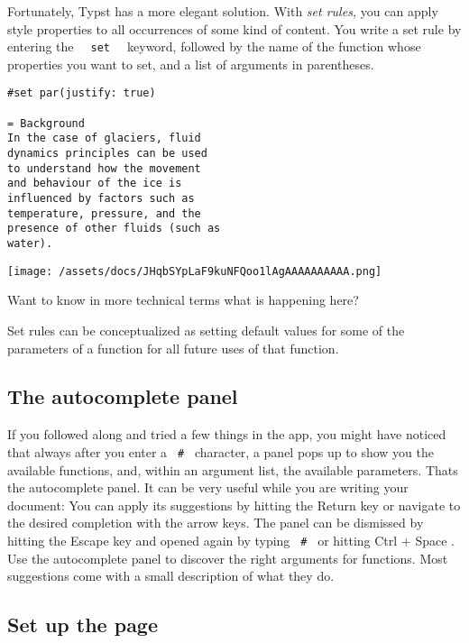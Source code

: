 Fortunately, Typst has a more elegant solution. With \emph{set rules,}
you can apply style properties to all occurrences of some kind of
content. You write a set rule by entering the
\texttt{\ }{\texttt{\ set\ }}\texttt{\ } keyword, followed by the name
of the function whose properties you want to set, and a list of
arguments in parentheses.

\begin{verbatim}
#set par(justify: true)

= Background
In the case of glaciers, fluid
dynamics principles can be used
to understand how the movement
and behaviour of the ice is
influenced by factors such as
temperature, pressure, and the
presence of other fluids (such as
water).
\end{verbatim}

\texttt{[image: /assets/docs/JHqbSYpLaF9kuNFQoo1lAgAAAAAAAAAA.png]}

Want to know in more technical terms what is happening here?

Set rules can be conceptualized as setting default values for some of
the parameters of a function for all future uses of that function.

\subsection{The autocomplete panel}\label{autocomplete}

If you followed along and tried a few things in the app, you might have
noticed that always after you enter a \texttt{\ \#\ } character, a panel
pops up to show you the available functions, and, within an argument
list, the available parameters. That\textquotesingle s the autocomplete
panel. It can be very useful while you are writing your document: You
can apply its suggestions by hitting the Return key or navigate to the
desired completion with the arrow keys. The panel can be dismissed by
hitting the Escape key and opened again by typing \texttt{\ \#\ } or
hitting { Ctrl } + { Space } . Use the autocomplete panel to discover
the right arguments for functions. Most suggestions come with a small
description of what they do.


\subsection{Set up the page}\label{page-setup}

